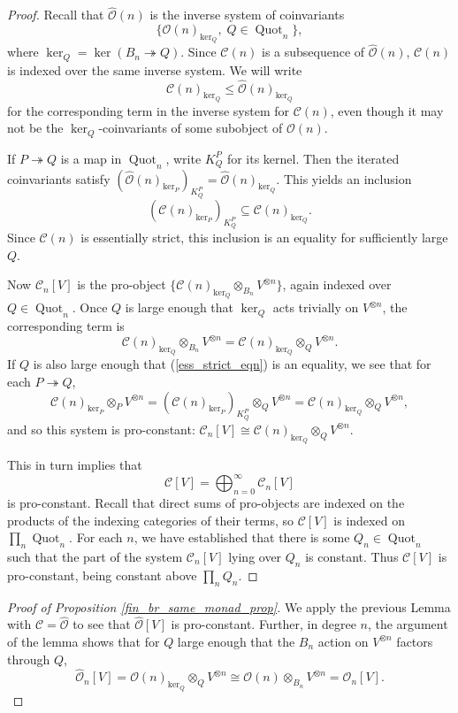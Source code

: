 \documentclass[12pt]{article}
\DeclareMathOperator{\Quot}{Quot}
\newcommand{\CC} {\mathcal{C}}
\newcommand{\OO}{\mathcal{O}}
\newcommand{\OOhat}{\widehat{\OO}}
\newcommand{\beqn}{\begin{equation}}
\newcommand{\eeqn}{\end{equation}}
\theoremstyle{plain}
\theoremstyle{definition}
\theoremstyle{remark}
\begin{document}
\begin{proof}

Recall that $\OOhat(n)$ is the inverse system of coinvariants
%
$$\{\OO(n)_{\ker_Q}, \; Q \in \Quot_n\},$$
%
where $\ker_Q =\ker(B_n \twoheadrightarrow Q)$.  Since $\CC(n)$ is a subsequence of $\OOhat(n)$, $\CC(n)$ is indexed over the same inverse system.  We will write 
%
$$\CC(n)_{\ker_Q} \leq \OOhat(n)_{\ker_Q}$$
%
for the corresponding term in the inverse system for $\CC(n)$, even though it may not be the $\ker_Q$-coinvariants of some subobject of $\OO(n)$.

If $P \twoheadrightarrow Q$ is a map in $\Quot_n$, write $K^P_Q$ for its kernel.  Then the iterated coinvariants satisfy $(\OOhat(n)_{\ker_P})_{K^P_Q} = \OOhat(n)_{\ker_Q}$.  This yields an inclusion
%
\beqn \label{ess_strict_eqn} (\CC(n)_{\ker_P})_{K^P_Q} \subseteq \CC(n)_{\ker_Q}.\eeqn
%
Since $\CC(n)$ is essentially strict, this inclusion is an equality for sufficiently large $Q$.

Now $\CC_n[V]$ is the pro-object $\{\CC(n)_{\ker_Q} \otimes_{B_n} V^{\otimes n} \}$, again indexed over $Q \in \Quot_n$.  Once $Q$ is large enough that $\ker_Q$ acts trivially on $V^{\otimes n}$, the corresponding term is
%
$$\CC(n)_{\ker_Q} \otimes_{B_n} V^{\otimes n} = \CC(n)_{\ker_Q} \otimes_{Q} V^{\otimes n}.$$
%
If $Q$ is also large enough that (\ref{ess_strict_eqn}) is an equality, we see that for each $P \twoheadrightarrow Q$,
%
$$\CC(n)_{\ker_P} \otimes_{P} V^{\otimes n} = (\CC(n)_{\ker_P})_{K^P_Q} \otimes_Q V^{\otimes n} =  \CC(n)_{\ker_Q} \otimes_{Q} V^{\otimes n},$$
%
and so this system is pro-constant: $\CC_n[V] \cong \CC(n)_{\ker_Q} \otimes_Q V^{\otimes n}$.  

This in turn implies that 
%
$$\CC[V] = \bigoplus_{n=0}^{\infty} \CC_n[V]$$
%
is pro-constant.  Recall that direct sums of pro-objects are indexed on the products of the indexing categories of their terms, so $\CC[V]$ is indexed on $\prod_n \Quot_n$.  For each $n$, we have established that there is some $Q_n \in \Quot_n$ such that the part of the system $\CC_n[V]$ lying over $Q_n$ is constant.  Thus $\CC[V]$ is pro-constant, being constant above $\prod_n Q_n$.


\end{proof}


\begin{proof}[Proof of Proposition \ref{fin_br_same_monad_prop}]

We apply the previous Lemma with $\CC = \OOhat$ to see that $\OOhat[V]$ is pro-constant.  Further, in degree $n$, the argument of the lemma shows that for $Q$ large enough that the $B_n$ action on $V^{\otimes n}$ factors through $Q$,
%
$$\OOhat_n[V] = \OO(n)_{\ker_Q} \otimes_Q V^{\otimes n} \cong \OO(n) \otimes_{B_n} V^{\otimes n} = \OO_n[V].$$

\end{proof}
\end{document}
